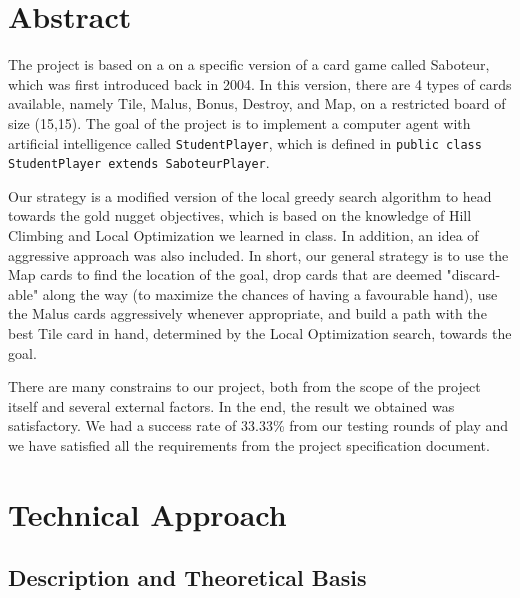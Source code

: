 \documentclass[12pt,twoside,letterpaper]{article}
\begin{document}

\tableofcontents
\newpage
\newpage

\section{Abstract}
The project is based on a on a specific version of a card game called Saboteur, which was first introduced back in 2004. In this version, there are 4 types of cards available, namely Tile, Malus, Bonus, Destroy, and Map, on a  restricted board of size (15,15). The goal of the project is to implement a computer agent with artificial intelligence called \texttt{StudentPlayer}, which is defined in \newline
\texttt{public class StudentPlayer extends SaboteurPlayer}.
\par Our strategy is a modified version of the local greedy search algorithm to head towards the gold nugget objectives, which is based on the knowledge of Hill Climbing and Local Optimization we learned in class. In addition, an idea of aggressive approach was also included. In short, our general strategy is to use the Map cards to find the location of the goal, drop cards that are deemed "discard-able" along the way (to maximize the chances of having a favourable hand), use the Malus cards aggressively whenever appropriate, and build a path with the best Tile card in hand, determined by the Local Optimization search, towards the goal.
\par There are many constrains to our project, both from the scope of the project itself and several external factors. In the end, the result we obtained was satisfactory. We had a success rate of 33.33\% from our testing rounds of play and we have satisfied all the requirements from the project specification document.
\clearpage

\section{Technical Approach}
\subsection{Description and Theoretical Basis}
\lipsum
\clearpage
\end{document}
